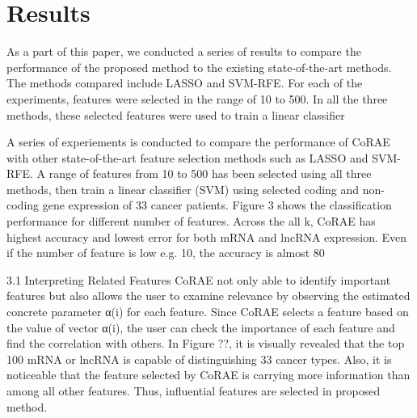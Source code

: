 \section{Results}

As a part of this paper, we conducted a series of results to compare the performance of the proposed method to the existing state-of-the-art methods.
The methods compared include LASSO and SVM-RFE.
For each of the experiments, features were selected in the range of 10 to 500.
In all the three methods, these selected features were used to train a linear classifier 




A series of experiements is conducted to compare the performance of CoRAE with other state-of-the-art feature selection methods such as LASSO and SVM-RFE. A range of features from 10 to 500 has been selected using all three methods, then train a linear classifier (SVM) using selected coding and non-coding gene expression of 33 cancer patients. Figure 3 shows the classification performance for different number of features. Across the all k, CoRAE has highest accuracy and lowest error for both mRNA and lncRNA expression. Even if the number of feature is low e.g. 10, the accuracy is almost 80%

3.1 Interpreting Related Features
CoRAE not only able to identify important features but also allows the user to examine relevance by observing the estimated concrete parameter α(i) for each feature. Since CoRAE selects a feature based on the value of vector α(i), the user can check the importance of each feature and find the correlation with others. In Figure ??, it is visually revealed that the top 100 mRNA or lncRNA is capable of distinguishing 33 cancer types. Also, it is noticeable that the feature selected by CoRAE is carrying more information than among all other features. Thus, influential features are selected in proposed method.
